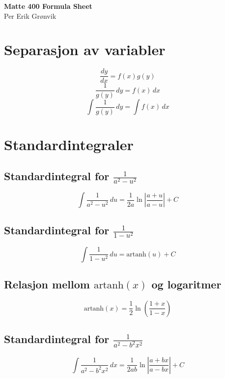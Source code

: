 \documentclass[a4paper,8pt,fleqn]{article}
\newcommand{\bodyfontsize}{\small}         %
\newcommand{\setbodyfontsize}{\bodyfontsize\selectfont}
\begin{document}
\setbodyfontsize

\begin{multicols}{3}

\begin{minipage}{\linewidth}
{\bfseries Matte 400 Formula Sheet} \\
{\scriptsize Per Erik Grønvik }
\end{minipage}











\section{Separasjon av variabler}
\[
\frac{dy}{dx} = f(x)g(y)
\]
\[
\frac{1}{g(y)} \, dy = f(x) \, dx
\]
\[
\int \frac{1}{g(y)} \, dy = \int f(x) \, dx
\]

\section{Standardintegraler}
\subsection{Standardintegral for \(\frac{1}{a^2 - u^2}\)}
\[
\int \frac{1}{a^2 - u^2} \, du = \frac{1}{2a} \ln\left|\frac{a + u}{a - u}\right| + C
\]

\subsection{Standardintegral for \(\frac{1}{1 - u^2}\)}
\[
\int \frac{1}{1 - u^2} \, du = \text{artanh}(u) + C
\]

\subsection{Relasjon mellom \(\text{artanh}(x)\) og logaritmer}
\[
\text{artanh}(x) = \frac{1}{2} \ln\left(\frac{1 + x}{1 - x}\right)
\]

\subsection{Standardintegral for \(\frac{1}{a^2 - b^2x^2}\)}
\[
\int \frac{1}{a^2 - b^2x^2} \, dx = \frac{1}{2ab} \ln\left|\frac{a + bx}{a - bx}\right| + C
\]


\end{multicols}
\end{document}

